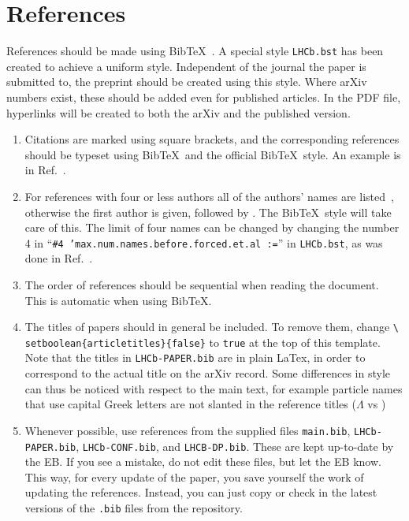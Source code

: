 \section{References}
\label{sec:References}

References should be made using Bib\TeX~\cite{BibTeX}. A special style
\texttt{LHCb.bst} has been created to achieve a uniform
style. Independent of the journal the paper is submitted to, the
preprint should be created using this style. Where arXiv numbers
exist, these should be added even for published articles. In the PDF
file, hyperlinks will be created to both the arXiv and the published
version.

\begin{enumerate}

\item Citations are marked using square brackets, and the
  corresponding references should be typeset using Bib\TeX\ and the
  official \lhcb Bib\TeX\ style. An example is in
  Ref.~\cite{Sjostrand:2006za}.

\item For references with four or less authors all of the authors'
  names are listed~\cite{Weinberg:1967}, otherwise the first author
  is given, followed by \etal. The \lhcb Bib\TeX\ style will
  take care of this. The limit of four names can be changed by changing the number 4 in 
  ``{\tt \#4 'max.num.names.before.forced.et.al :=}''
  in {\tt LHCb.bst}, as was done in Ref.~\cite{LHCb-PAPER-2017-038}.

\item The order of references should be sequential when reading the
  document. This is automatic when using Bib\TeX.

\item The titles of papers should in general be included. To remove
  them, change \texttt{\textbackslash
    setboolean\{articletitles\}\{false\}} to \texttt{true} at the top
  of this template.
  Note that the titles in \verb!LHCb-PAPER.bib! are in plain LaTex,
  in order to correspond to the actual title on the arXiv record.
  Some differences in style can thus be noticed with respect to the
  main text, for example particle names that use capital Greek letters
  are not slanted in the reference titles ($\Lambda$ vs \Lz)  

\item Whenever possible, use references from the supplied files
\verb!main.bib!, \verb!LHCb-PAPER.bib!, \verb!LHCb-CONF.bib!, and \verb!LHCB-DP.bib!.
These are kept up-to-date by the EB. If you see a mistake, do not edit these files,
but let the EB know. This way, for every update of the paper, you save
yourself the work of updating the references. Instead, you can just copy or
check in the latest versions of the \verb!.bib! files from the repository.   


\end{enumerate}
